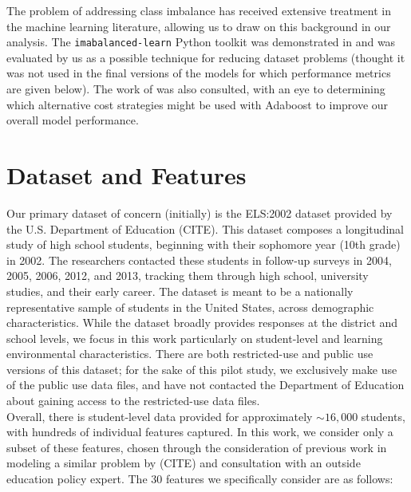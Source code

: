 \documentclass[conference]{IEEEtran}
\begin{document}
The problem of addressing class imbalance has received extensive treatment in the machine learning literature, allowing us to draw on this background in our analysis.
The \texttt{imabalanced-learn} Python toolkit was demonstrated in \cite{b3} and was evaluated by us as a possible technique for reducing dataset problems (thought it 
was not used in the final versions of the models for which performance metrics are given below). The work of \cite{b4} was also consulted, with an eye to determining which
alternative cost strategies might be used with Adaboost to improve our overall model performance. \\

\section{Dataset and Features}

Our primary dataset of concern (initially) is the ELS:2002 dataset provided by the U.S. Department of Education (CITE). This dataset composes a
longitudinal study of high school students, beginning with their sophomore year (10th grade) in 2002. The researchers contacted these students in
follow-up surveys in 2004, 2005, 2006, 2012, and 2013, tracking them through high school, university studies, and their early career. The dataset is
meant to be a nationally representative sample of students in the United States, across demographic characteristics. While the dataset broadly provides
responses at the district and school levels, we focus in this work particularly on student-level and learning environmental characteristics. There are both
restricted-use and public use versions of this dataset; for the sake of this pilot study, we exclusively make use of the public use data files, and have not 
contacted the Department of Education about gaining access to the restricted-use data files. \\

Overall, there is student-level data provided for approximately $\sim16,000$ students, with hundreds of individual features captured. In this work, we consider
only a subset of these features, chosen through the consideration of previous work in modeling a similar problem by (CITE) and consultation with an outside 
education policy expert. The 30 features we specifically consider are as follows:
\end{document}
